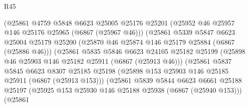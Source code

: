 \begin{lexlean}{R45}
\begin{coremodule}
{                                (@25861
                                  @4759
                                  @5848
                                  @6623
                                  @25005
                                  @25176
                                  @25201
                                  (@25952 @46 @25957 @146 @25176 @25965 (@6867 (@25967 @46)))
                                  (@25861
                                    @5339
                                    @5847
                                    @6623
                                    @25004
                                    @25179
                                    @25200
                                    (@25870 @46 @25874 @146 @25179 @25884 (@6867 (@25886 @46)))
                                    (@25861
                                      @5835
                                      @5846
                                      @6623
                                      @24105
                                      @25182
                                      @25199
                                      (@25898 @46 @25903 @146 @25182 @25911 (@6867 (@25913 @46)))
                                      (@25861
                                        @5837
                                        @5845
                                        @6623
                                        @8307
                                        @25185
                                        @25198
                                        (@25898
                                          @153
                                          @25903
                                          @146
                                          @25185
                                          @25911
                                          (@6867 (@25913 @153)))
                                        (@25861
                                          @5839
                                          @5844
                                          @6623
                                          @6661
                                          @25188
                                          @25197
                                          (@25925
                                            @153
                                            @25930
                                            @146
                                            @25188
                                            @25938
                                            (@6867 (@25940 @153)))
                                          (@25861
}
\end{coremodule}
\end{lexlean}

